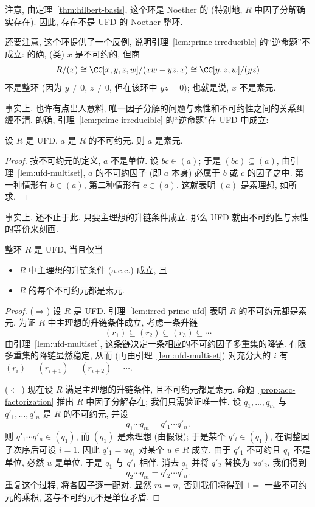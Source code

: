 \noindent 注意, 由定理~\ref{thm:hilbert-basis}, 这个环是 Noether 的 (特别地, $R$ 中因子分解确实存在). 因此, 存在不是 UFD 的 Noether 整环.

\noindent 还要注意, 这个环提供了一个反例, 说明引理~\ref{lem:prime-irreducible} 的``逆命题''不成立: 的确, (类) $x$ 是不可约的, 但商
\[
R/(x) \cong \CC[x,y,z,w]/(xw-yz,x)\cong \CC[y,z,w]/(yz)
\]
不是整环 (因为 $y\neq 0$, $z\neq 0$, 但在该环中 $yz=0$); 也就是说, $x$ 不是素元.

\noindent 事实上, 也许有点出人意料, 唯一因子分解的问题与素性和不可约性之间的关系纠缠不清. 的确, 引理~\ref{lem:prime-irreducible} 的``逆命题''在 UFD 中成立:

\begin{lemma}\label{lem:irred-prime-ufd}
设 $R$ 是 UFD, $a$ 是 $R$ 的不可约元. 则 $a$ 是素元.
\end{lemma}

\begin{proof}
按不可约元的定义, $a$ 不是单位. 设 $bc\in (a)$; 于是 $(bc)\subseteq (a)$, 由引理~\ref{lem:ufd-multiset}, $a$ 的不可约因子
(即 $a$ 本身) 必属于 $b$ 或 $c$ 的因子之中. 第一种情形有 $b\in (a)$, 第二种情形有 $c\in (a)$.
这就表明 $(a)$ 是素理想, 如所求.
\end{proof}

\noindent 事实上, 还不止于此. 只要主理想的升链条件成立, 那么 UFD 就由不可约性与素性的等价来刻画.

\begin{theorem}\label{thm:ufd-char}
整环 $R$ 是 UFD, 当且仅当
\begin{itemize}
\item $R$ 中主理想的升链条件 (a.c.c.) 成立, 且
\item $R$ 的每个不可约元都是素元.
\end{itemize}
\end{theorem}

\begin{proof}
($\Rightarrow$) 设 $R$ 是 UFD. 引理~\ref{lem:irred-prime-ufd} 表明 $R$ 的不可约元都是素元. 为证 $R$ 中主理想的升链条件成立,
考虑一条升链
\[
(r_1)\subseteq (r_2)\subseteq (r_3)\subseteq \cdots
\]
由引理~\ref{lem:ufd-multiset}, 这条链决定一条相应的不可约因子多重集的降链. 有限多重集的降链显然稳定, 从而 (再由引理~\ref{lem:ufd-multiset})
对充分大的 $i$ 有 $(r_i)=(r_{i+1})=(r_{i+2})=\cdots$.

($\Leftarrow$) 现在设 $R$ 满足主理想的升链条件, 且不可约元都是素元. 命题~\ref{prop:acc-factorization} 推出 $R$ 中因子分解存在;
我们只需验证唯一性. 设 $q_1,\dots,q_m$ 与 $q'_1,\dots,q'_n$ 是 $R$ 的不可约元, 并设
\[
q_1\cdots q_m = q'_1\cdots q'_n.
\]
则 $q'_1\cdots q'_n\in (q_1)$, 而 $(q_1)$ 是素理想 (由假设); 于是某个 $q'_i\in (q_1)$,
在调整因子次序后可设 $i=1$. 因此 $q'_1 = u q_1$ 对某个 $u\in R$ 成立. 由于 $q'_1$ 不可约且 $q_1$ 不是单位,
必然 $u$ 是单位. 于是 $q_1$ 与 $q'_1$ 相伴. 消去 $q_1$ 并将 $q'_2$ 替换为 $u q'_2$, 我们得到
\[
q_2\cdots q_m = q'_2\cdots q'_n.
\]
重复这个过程, 将各因子逐一配对. 显然 $m=n$, 否则我们将得到 $1=$ 一些不可约元的乘积, 这与不可约元不是单位矛盾.
\end{proof}

